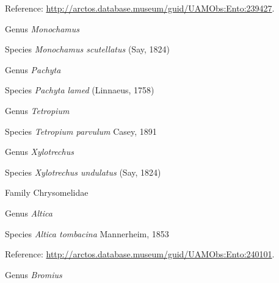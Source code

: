 \documentclass[9pt, article]{memoir}
\begin{document}
\begin{multicols}{2}
\vspace{6pt}Reference: 
\url{http://arctos.database.museum/guid/UAMObs:Ento:239427}.

\vspace{6pt}\noindent\hspace{30pt}Genus \textit{Monochamus}


\vspace{6pt}\noindent\hspace{36pt}Species \textit{Monochamus scutellatus} (Say, 1824)


\vspace{6pt}\noindent\hspace{30pt}Genus \textit{Pachyta}


\vspace{6pt}\noindent\hspace{36pt}Species \textit{Pachyta lamed} (Linnaeus, 1758)


\vspace{6pt}\noindent\hspace{30pt}Genus \textit{Tetropium}


\vspace{6pt}\noindent\hspace{36pt}Species \textit{Tetropium parvulum} Casey, 1891


\vspace{6pt}\noindent\hspace{30pt}Genus \textit{Xylotrechus}


\vspace{6pt}\noindent\hspace{36pt}Species \textit{Xylotrechus undulatus} (Say, 1824)


\vspace{6pt}\noindent\hspace{24pt}Family Chrysomelidae


\vspace{6pt}\noindent\hspace{30pt}Genus \textit{Altica}


\vspace{6pt}\noindent\hspace{36pt}Species \textit{Altica tombacina} Mannerheim, 1853


\vspace{6pt}Reference: 
\url{http://arctos.database.museum/guid/UAMObs:Ento:240101}.

\vspace{6pt}\noindent\hspace{30pt}Genus \textit{Bromius}



\end{multicols}
\end{document}
